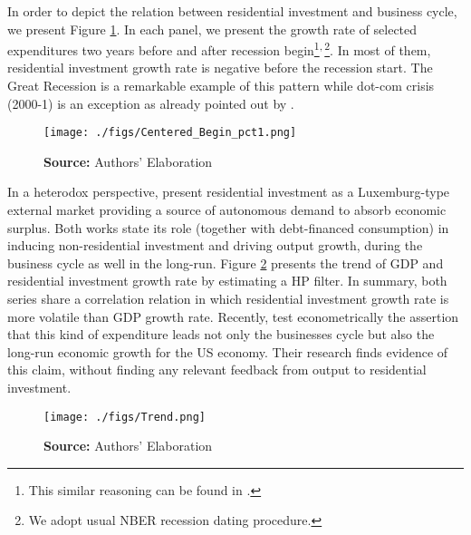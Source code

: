 \documentclass[12pt, a4paper]{article}
\begin{document}
In order to depict the relation between residential investment and business cycle, we present Figure \ref{fig:cycle}.
In each panel, we present the growth rate of selected expenditures two years before and after recession begin\footnote{This similar reasoning can be found in \textcite{leamer_housing_2007}.}\textsuperscript{,}\,\footnote{We adopt usual NBER recession dating procedure.}.
In most of them, residential investment growth rate is negative before the recession start.
The Great Recession is a remarkable example of this pattern while dot-com crisis (2000-1) is an exception as already pointed out by \textcite{leamer_housing_2007}.


\begin{figure}[H]
	\centering
	\caption{Selected expecditure growth rates 2 years before and after recession start}
	\label{fig:cycle}
	\texttt{[image: ./figs/Centered\_Begin\_pct1.png]}
	\caption*{\textbf{Source:} Authors' Elaboration}
\end{figure}

In a heterodox perspective, \textcites{fiebiger_semi-autonomous_2018}{fiebiger_trend_2017} present residential investment as a Luxemburg-type external market providing a source of autonomous demand to absorb economic surplus.
Both works state its role (together with debt-financed consumption) in inducing non-residential investment and driving output growth, during the business cycle as well in the long-run.
Figure \ref{fig:trend} presents the trend of GDP and residential investment growth rate by estimating a HP filter.
In summary, both series share a correlation relation in which residential investment growth rate is more volatile than GDP growth rate.
Recently, \textcite{perez_Montiel_2021} test econometrically the assertion that this kind of expenditure leads not only the businesses cycle but also the long-run economic growth for the US economy. Their research finds evidence of this claim, without finding any relevant feedback from output to residential investment.

\begin{figure}[H]
	\centering
	\caption{GDP and Residential investment growth rate tred (HP filter, $\lambda = 1600$)}
	\label{fig:trend}
	\texttt{[image: ./figs/Trend.png]}
	\caption*{\textbf{Source:} Authors' Elaboration}
\end{figure}
\end{document}
